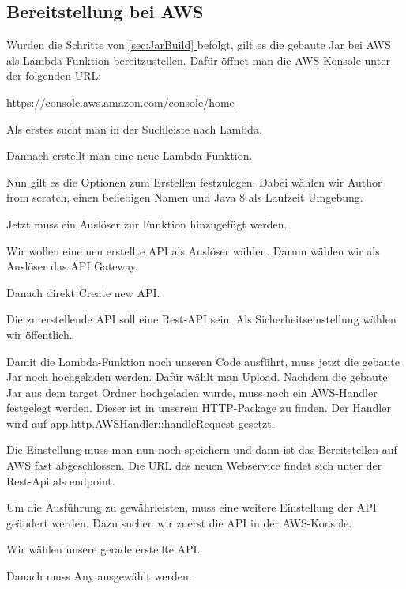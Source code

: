 \documentclass{article}
\newcommand{\fullref}[1]{\hyperref[{#1}]{\ref{#1} \nameref{#1}}} %
\newcommand{\gquote}[1]{\glqq #1\grqq} %
\newcommand{\displayimage}[1]{\begin{center}\makebox[\textwidth]{\texttt{[image: \#1]}}\end{center}}
\begin{document}
\subsection{Bereitstellung bei AWS}
\label{sec:AWSBuild}
Wurden die Schritte von \fullref{sec:JarBuild} befolgt, gilt es die gebaute Jar bei AWS als Lambda-Funktion bereitzustellen. Dafür öffnet man die AWS-Konsole unter der folgenden URL:
\begin{center}
    \url{https://console.aws.amazon.com/console/home}
\end{center}
Als erstes sucht man in der Suchleiste nach \gquote{Lambda}.
\displayimage{resources/aws_installation/search_lambda.png}
Dannach erstellt man eine neue Lambda-Funktion.
\displayimage{resources/aws_installation/create_function.png}
Nun gilt es die Optionen zum Erstellen festzulegen. Dabei wählen wir \gquote{Author from scratch}, einen beliebigen Namen und Java 8 als Laufzeit Umgebung.
\displayimage{resources/aws_installation/create_function_detail.png}
Jetzt muss ein Auslöser zur Funktion hinzugefügt werden.
\displayimage{resources/aws_installation/add_trigger.png}
Wir wollen eine neu erstellte API als Auslöser wählen. Darum wählen wir als Auslöser das \gquote{API Gateway}.
\displayimage{resources/aws_installation/select_api_gateway2.png}
Danach direkt \gquote{Create new API}.
\displayimage{resources/aws_installation/create_new_api.png}
Die zu erstellende API soll eine Rest-API sein. Als Sicherheitseinstellung wählen wir \gquote{öffentlich}.
\displayimage{resources/aws_installation/rest_api.png}
Damit die Lambda-Funktion noch unseren Code ausführt, muss jetzt die gebaute Jar noch hochgeladen werden.
Dafür wählt man \gquote{Upload}. Nachdem die gebaute Jar aus dem target Ordner hochgeladen wurde, muss noch ein AWS-Handler festgelegt werden.
Dieser ist in unserem HTTP-Package zu finden. Der Handler wird auf \gquote{app.http.AWSHandler::handleRequest} gesetzt.
\displayimage{resources/aws_installation/upload_jar.png}
Die Einstellung muss man nun noch speichern und dann ist das Bereitstellen auf AWS fast abgeschlossen. Die URL des neuen Webservice findet sich unter der Rest-Api als \gquote{endpoint}.
\displayimage{resources/aws_installation/find_endpoint.png}
Um die Ausführung zu gewährleisten, muss eine weitere Einstellung der API geändert werden. Dazu suchen wir zuerst die API in der AWS-Konsole.
\displayimage{resources/aws_installation/select_api_gateway.png}
Wir wählen unsere gerade erstellte API.
\displayimage{resources/aws_installation/select_our_api.png}
Danach muss \gquote{Any} ausgewählt werden.
\end{document}
